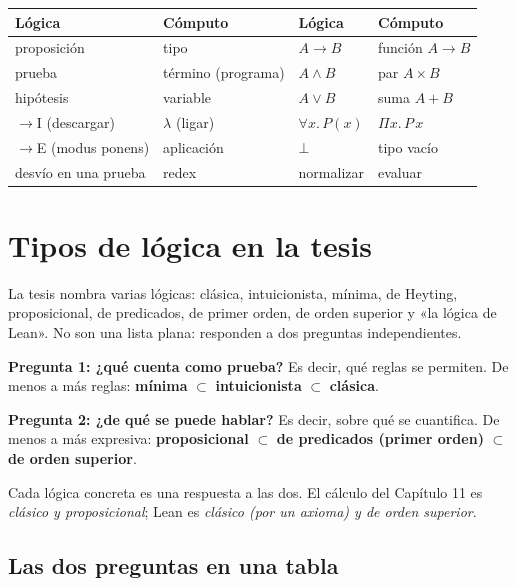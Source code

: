 \documentclass[11pt,a4paper]{article}
\newcommand{\termino}[1]{\textbf{#1}}
\begin{document}
\begin{center}
\renewcommand{\arraystretch}{1.2}
{\small
\begin{tabular}{@{}ll@{\qquad}ll@{}}
\toprule
\textbf{Lógica} & \textbf{Cómputo} & \textbf{Lógica} & \textbf{Cómputo}\\
\midrule
proposición & tipo & \(A\to B\) & función \(A\to B\)\\
prueba & término (programa) & \(A\wedge B\) & par \(A\times B\)\\
hipótesis & variable & \(A\vee B\) & suma \(A+B\)\\
\(\to\)I (descargar) & \(\lambda\) (ligar) & \(\forall x.\,P(x)\) & \(\Pi x.\,P\,x\)\\
\(\to\)E (modus ponens) & aplicación & \(\bot\) & tipo vacío\\
desvío en una prueba & redex & normalizar & evaluar\\
\bottomrule
\end{tabular}}
\end{center}

\section{Tipos de lógica en la tesis}

La tesis nombra varias lógicas: clásica, intuicionista, mínima, de Heyting,
proposicional, de predicados, de primer orden, de orden superior y «la lógica
de Lean». No son una lista plana: responden a dos preguntas independientes.

\begin{clave}
\textbf{Pregunta 1: ¿qué cuenta como prueba?} Es decir, qué reglas se
permiten. De menos a más reglas:
\termino{mínima} \(\subset\) \termino{intuicionista} \(\subset\) \termino{clásica}.

\smallskip
\textbf{Pregunta 2: ¿de qué se puede hablar?} Es decir, sobre qué se
cuantifica. De menos a más expresiva:
\termino{proposicional} \(\subset\) \termino{de predicados (primer orden)}
\(\subset\) \termino{de orden superior}.

\smallskip
Cada lógica concreta es una respuesta a las dos. El cálculo del Capítulo 11 es
\emph{clásico y proposicional}; Lean es \emph{clásico (por un axioma) y de
orden superior}.
\end{clave}

\subsection{Las dos preguntas en una tabla}
\end{document}
